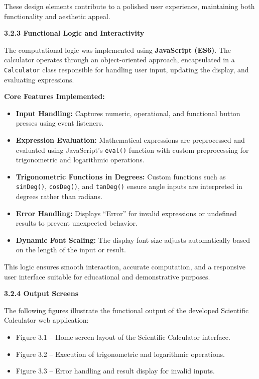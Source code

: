\documentclass[a4paper,12pt,oneside]{report}
\numberwithin{equation}{chapter}
\numberwithin{figure}{chapter}
\numberwithin{table}{chapter}
\begin{document}
These design elements contribute to a polished user experience, maintaining both functionality and aesthetic appeal.

\bigskip
\noindent
\textbf{3.2.3 Functional Logic and Interactivity}

The computational logic was implemented using \textbf{JavaScript (ES6)}. The calculator operates through an object-oriented approach, encapsulated in a \texttt{Calculator} class responsible for handling user input, updating the display, and evaluating expressions.

\textbf{Core Features Implemented:}
\begin{itemize}
    \item \textbf{Input Handling:} Captures numeric, operational, and functional button presses using event listeners.
    \item \textbf{Expression Evaluation:} Mathematical expressions are preprocessed and evaluated using JavaScript’s \texttt{eval()} function with custom preprocessing for trigonometric and logarithmic operations.
    \item \textbf{Trigonometric Functions in Degrees:} Custom functions such as \texttt{sinDeg()}, \texttt{cosDeg()}, and \texttt{tanDeg()} ensure angle inputs are interpreted in degrees rather than radians.
    \item \textbf{Error Handling:} Displays “Error” for invalid expressions or undefined results to prevent unexpected behavior.
    \item \textbf{Dynamic Font Scaling:} The display font size adjusts automatically based on the length of the input or result.
\end{itemize}

This logic ensures smooth interaction, accurate computation, and a responsive user interface suitable for educational and demonstrative purposes.

\bigskip
\noindent
\textbf{3.2.4 Output Screens}

The following figures illustrate the functional output of the developed Scientific Calculator web application:

\begin{itemize}
    \item Figure 3.1 – Home screen layout of the Scientific Calculator interface.
    \item Figure 3.2 – Execution of trigonometric and logarithmic operations.
    \item Figure 3.3 – Error handling and result display for invalid inputs.
\end{itemize}
\end{document}
